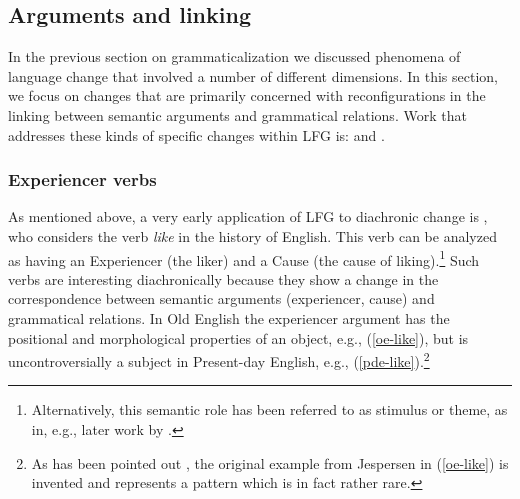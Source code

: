\documentclass[output=paper,hidelinks]{langscibook}
\begin{document}
\subsection{Arguments and linking}
\label{sec:Historical:arg-gf}

In the previous section on grammaticalization we discussed phenomena of language change that involved a number of different dimensions. In this section, we focus on changes that are primarily concerned with reconfigurations in the linking  between semantic arguments and grammatical relations. Work that addresses these kinds of specific changes within LFG is: \citet{allen1986,allen1995case,KM15,schaetzle18} and \citet{beck-butt2021}. 

\subsubsection{Experiencer verbs}\label{subsect:allen-exp}

As mentioned above, a very early application of LFG to diachronic change is \citet{allen1986}, who considers  the verb \textit{like} in the history of English. This verb  can be analyzed as having an Experiencer (the liker) and a Cause (the cause of liking).\footnote{Alternatively, this semantic role has been referred to as stimulus or theme, as in, e.g., later work by \citet{allen1995case}.} Such verbs are interesting diachronically because they show   a change in the correspondence between semantic arguments (experiencer, cause) and grammatical relations. In Old English the experiencer argument has the positional and morphological properties of an object, e.g., (\ref{oe-like}), but is uncontroversially a subject in Present-day English, e.g., (\ref{pde-like}).\footnote{As has been pointed out \citep[81]{denison1993english}, the original example from Jespersen in (\ref{oe-like}) is invented and represents a pattern which is in fact rather rare.}

\begin{exe} 
\ex 
\begin{xlist}
\end{xlist}
\end{exe}
\end{document}
